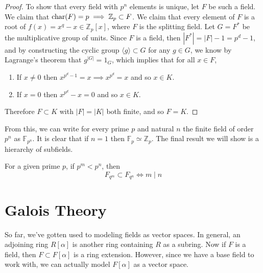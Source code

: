 \begin{proof}
    To show that every field with $p^n$ elements is unique, let $F$ be such a field. We claim that $\operatorname{char}(F) = p \implies \mathbb{Z}_p \subset F$. We claim that every element of $F$ is a root of $f(x) = x^q - x \in \mathbb{Z}_p [x]$, where $F$ is the splitting field. Let $G = F^\ast$ be the multiplicative group of units. Since $F$ is a field, then $|F^\ast| = |F| - 1 = p^d - 1$, and by constructing the cyclic group $\langle g \rangle \subset G$ for any $g \in G$, we know by Lagrange's theorem that $g^{|G|} = 1_G$, which implies that for all $x \in F$, 
    \begin{enumerate}
      \item If $x \neq 0$ then $x^{p^d - 1} = x \implies x^{p^d} = x$ and so $x \in K$. 
      \item If $x = 0$ then $x^{p^d} - x = 0$ and so $x \in K$. 
    \end{enumerate}
    Therefore $F \subset K$ with $|F| = |K|$ both finite, and so $F = K$. 
  \end{proof} 

  From this, we can write for every prime $p$ and natural $n$ the finite field of order $p^n$ as $\mathbb{F}_{p^n}$. It is clear that if $n = 1$ then $\mathbb{F}_p \simeq \mathbb{Z}_p$. The final result we will show is a hierarchy of subfields. 

  \begin{theorem}
    For a given prime $p$, if $p^m < p^n$, then 
    \begin{equation}
      F_{q^m} \subset F_{q^n} \iff m \mid n
    \end{equation}
  \end{theorem}

\section{Galois Theory} 

  So far, we've gotten used to modeling fields as vector spaces. In general, an adjoining ring $R[\alpha]$ is another ring containing $R$ as a subring. Now if $F$ is a field, then $F \subset F[\alpha]$ is a ring extension. However, since we have a base field to work with, we can actually model $F[\alpha]$ as a vector space.  

